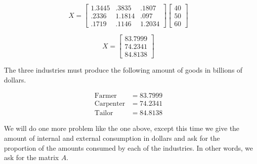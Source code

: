 \begin{solution}
    \[ X = \begin{bmatrix}
            1.3445 & .3835  & .1807  \\
            .2336  & 1.1814 & .097   \\
            .1719  & .1146  & 1.2034
        \end{bmatrix} \begin{bmatrix}
            40 \\
            50 \\
            60
        \end{bmatrix} \]

    \[ X = \begin{bmatrix}
            83.7999 \\
            74.2341 \\
            84.8138
        \end{bmatrix} \]

    The three industries must produce the following amount of goods in billions of dollars.

    \[
        \begin{aligned}
            \text{Farmer}    & = 83.7999 \\
            \text{Carpenter} & = 74.2341 \\
            \text{Tailor}    & = 84.8138
        \end{aligned}
    \]

\end{solution}

We will do one more problem like the one above, except this time we give the amount of internal and external consumption in dollars and ask for the proportion of the amounts consumed by each of the industries. In other words, we ask for the matrix \( A \).

